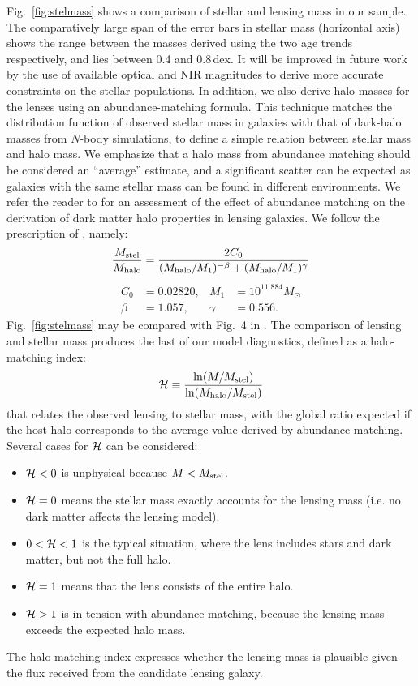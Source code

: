Fig.~\ref{fig:stelmass} shows a comparison of stellar and lensing mass
in our sample.  The comparatively large span of the error bars in
stellar mass (horizontal axis) shows the range between the masses
derived using the two age trends respectively, and lies between 0.4 and
0.8\,dex.  It will be improved in future work by the use of available
optical and NIR magnitudes to derive more accurate constraints on the
stellar populations.  In addition, we also derive halo masses for the
lenses using an abundance-matching formula.  This technique matches
the distribution function of observed stellar mass in galaxies with
that of dark-halo masses from $N$-body simulations, to define  a simple
relation between stellar mass and halo mass.  We emphasize that a halo
mass from abundance matching should be considered an ``average''
estimate, and a significant scatter can be expected as galaxies with
the same stellar mass can be found in different environments. We refer
the reader to \cite{2012MNRAS.424..104L} for an assessment of the
effect of abundance matching on the derivation of dark matter halo
properties in lensing galaxies. We follow the prescription of
\citet{2010ApJ...710..903M}, namely:
\begin{equation}
    \frac{M_\text{stel}}{M_\text{halo}} = \frac{2C_0}{(M_\text{halo}/M_1)^{-\beta} +
                                     (M_\text{halo}/M_1)^\gamma}
\end{equation}
\begin{align*}
    C_0 &= 0.02820, & M_1 &= 10^{11.884} M_\odot \\
    \beta &= 1.057, & \gamma &= 0.556.
\end{align*}
Fig.~\ref{fig:stelmass} may be compared with Fig.~4 in
\cite{2011ApJ...734...69M}.
The comparison of lensing and stellar mass produces the last 
of our model diagnostics, defined as a halo-matching index:
\begin{equation}
\mathcal{H} \equiv \frac{\ln(M/M_\text{stel})}{\ln(M_\text{halo}/M_\text{stel})}
\end{equation}
that relates the observed lensing to stellar mass, with the
global ratio expected if the host halo corresponds to the
average value derived by abundance matching. Several cases
for $\mathcal{H}$ can be considered:
\begin{itemize}
\item $\mathcal{H} < 0$ is unphysical because $M<M_\text{stel}$.
\item $\mathcal{H} = 0$ means the stellar mass exactly accounts for the
  lensing mass (i.e. no dark matter affects the lensing model).
\item $0 < \mathcal{H} < 1$ is the typical situation, where the lens
  includes stars and dark matter, but not the full halo.
\item $\mathcal{H} = 1$ means that the lens consists of the entire halo.
\item $\mathcal{H} > 1$ is in tension with abundance-matching, because the
  lensing mass exceeds the expected halo mass.
\end{itemize}
The halo-matching index expresses whether the lensing mass is
plausible given the flux received from the candidate lensing galaxy.

